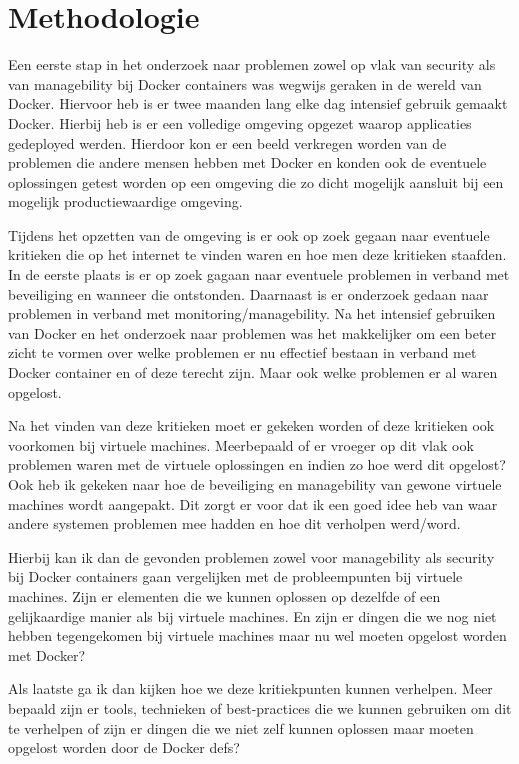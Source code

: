 \chapter{Methodologie}
\label{ch:methodologie}

Een eerste stap in het onderzoek naar problemen zowel op vlak van security als van managebility bij Docker containers was wegwijs geraken in de wereld van Docker. Hiervoor heb is er twee maanden lang elke dag intensief gebruik gemaakt Docker. Hierbij heb is er een volledige omgeving opgezet waarop applicaties gedeployed werden. Hierdoor kon er een beeld verkregen worden van de problemen die andere mensen hebben met Docker en konden ook de eventuele oplossingen getest worden op een omgeving die zo dicht mogelijk aansluit bij een mogelijk productiewaardige omgeving.

Tijdens het opzetten van de omgeving is er ook op zoek gegaan naar eventuele kritieken die op het internet te vinden waren en hoe men deze kritieken staafden. In de eerste plaats is er op zoek gagaan naar eventuele problemen in verband met beveiliging en wanneer die ontstonden. Daarnaast is er onderzoek gedaan naar problemen in verband met monitoring/managebility. Na het intensief gebruiken van Docker en het onderzoek naar problemen was het makkelijker om een beter zicht te vormen over welke problemen er nu effectief bestaan in verband met Docker container en of deze terecht zijn. Maar ook welke problemen er al waren opgelost.

Na het vinden van deze kritieken moet er gekeken worden of deze kritieken ook voorkomen bij virtuele machines. Meerbepaald of er vroeger op dit vlak ook problemen waren met de virtuele oplossingen en indien zo hoe werd dit opgelost? Ook heb ik gekeken naar hoe de beveiliging en managebility van gewone virtuele machines wordt aangepakt. Dit zorgt er voor dat ik een goed idee heb van waar andere systemen problemen mee hadden en hoe dit verholpen werd/word.

Hierbij kan ik dan de gevonden problemen zowel voor managebility als security bij Docker containers gaan vergelijken met de probleempunten bij virtuele machines.  Zijn er elementen die we kunnen oplossen op dezelfde of een gelijkaardige manier als bij virtuele machines. En zijn er dingen die we nog niet hebben tegengekomen bij virtuele machines maar nu wel moeten opgelost worden met Docker?

Als laatste ga ik dan kijken hoe we deze kritiekpunten kunnen verhelpen. Meer bepaald zijn er tools, technieken of best-practices die we kunnen gebruiken om dit te verhelpen of zijn er dingen die we niet zelf kunnen oplossen maar moeten opgelost worden door de Docker defs?